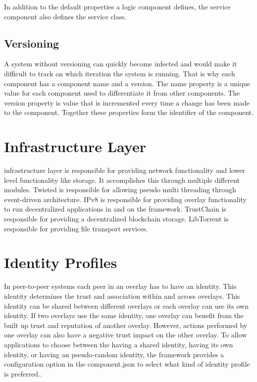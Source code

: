 In addition to the default properties a logic component defines, the service component also defines the service class.


\subsection{Versioning}

A system without versioning can quickly become infected and would make it difficult to track on which iteration the system is running. That is why each component has a component name and a version. The name property is a unique value for each component used to differentiate it from other components. The version property is value that is incremented every time a change has been made to the component. Together these properties form the identifier of the component.

\section{Infrastructure Layer}

infrastructure layer is responsible for providing network functionality and lower level functionality like storage. It accomplishes this through multiple different modules. Twisted is responsible for allowing pseudo multi threading through event-driven architecture. IPv8 is responsible for providing overlay functionality to run decentralized applications in and on the framework. TrustChain is responsible for providing a decentralized blockchain storage. LibTorrent is responsible for providing file transport services.

\section{Identity Profiles}

In peer-to-peer systems each peer in an overlay has to have an identity. This identity determines the trust and association within and across overlays. This identity can be shared between different overlays or each overlay can use its own identity. If two overlays use the same identity, one overlay can benefit from the built up trust and reputation of another overlay. However, actions performed by one overlay can also have a negative trust impact on the other overlay. To allow applications to choose between the having a shared identity, having its own identity, or having an pseudo-random identity,  the framework provides a configuration option in the component.json to select what kind of identity profile is preferred..  

